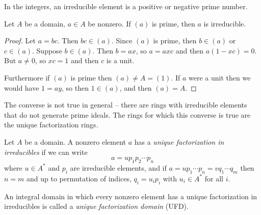 \begin{xmpl}
In the integers, an irreducible element is a positive or negative
prime number.
\end{xmpl}

\begin{prop}
Let $A$ be a domain, $a \in A$ be nonzero. If $(a)$ is prime, then
$a$ is irreducible.
\end{prop}

\begin{proof}
Let $a = bc$. Then $bc \in (a)$. Since $(a)$ is
prime, then $b \in (a)$ or $c \in (a)$. Suppose $b \in (a)$. Then
$b = ax$, so $a = axc$ and then $a(1 - xc) = 0$. But $a \neq 0$, so
$xc = 1$ and then $c$ is a unit.

Furthermore if $(a)$ is prime then $(a) \neq A = (1)$. If $a$ were a
unit then we would have $1 = ay$, so then $1 \in (a)$, and then
$(a) = A$.
\end{proof}

\begin{remark}
The converse is not true in general -- there are rings with
irreducible elements that do not generate prime ideals. The rings for
which this converse is true are the unique factorization rings.
\end{remark}

\begin{defn}
Let $A$ be a domain. A nonzero element $a$ has a
\emph{unique factorization in irreducibles} if
we can write
$$
a = u p_1 p_2 \cdots p_n
$$
where $u \in A^\ast$ and $p_i$ are irreducible elements, and if
$a = u p_1 \cdots p_n = v q_1 \cdots q_m$ then $n = m$ and
up to permutation of indices, $q_i = u_i p_i$ with $u_i \in A^\ast$
for all $i$.
\end{defn}

\begin{defn}
An integral domain in which every nonzero element has a unique
factorization in irreducibles is called a
\emph{unique factorization domain} (UFD).
\end{defn}

